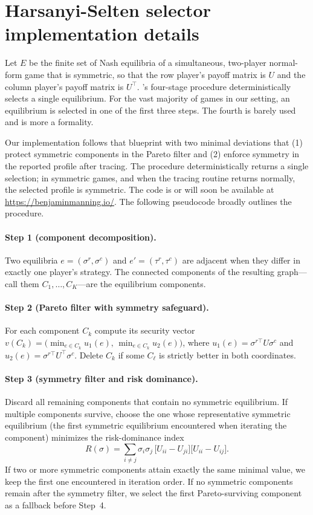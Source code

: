 \section{Harsanyi-Selten selector implementation details}
\label{app:nash-selector}

Let $E$ be the finite set of Nash equilibria of a simultaneous, two-player normal-form game that is symmetric, so that the row player's payoff matrix is $U$ and the column player's payoff matrix is $U^\top$.
\cite{HarsanyiSelten1988}'s four-stage procedure deterministically selects a single equilibrium.
For the vast majority of games in our setting, an equilibrium is selected in one of the first three steps.
The fourth is barely used and is more a formality.

Our implementation follows that blueprint with two minimal deviations that (1) protect symmetric components in the Pareto filter and (2) enforce symmetry in the reported profile after tracing.
The procedure deterministically returns a single selection; in symmetric games, and when the tracing routine returns normally, the selected profile is symmetric.
The code is or will soon be available at \url{https://benjaminmanning.io/}.
The following pseudocode broadly outlines the procedure.

\paragraph{Step 1 (component decomposition).}
Two equilibria $e=(\sigma^r,\sigma^c)$ and $e'=(\tau^r,\tau^c)$ are adjacent when they differ in exactly one player's strategy.
The connected components of the resulting graph---call them $C_1,\dots,C_K$---are the equilibrium components.

\paragraph{Step 2 (Pareto filter with symmetry safeguard).}
For each component $C_k$ compute its security vector $v(C_k)=\bigl(\min_{e\in C_k}u_1(e),\,\min_{e\in C_k}u_2(e)\bigr)$, where $u_1(e)=\sigma^{r\top}U\sigma^c$ and $u_2(e)=\sigma^{r\top}U^\top\sigma^c$.
Delete $C_k$ if some $C_\ell$ is strictly better in both coordinates. 

\paragraph{Step 3 (symmetry filter and risk dominance).}
Discard all remaining components that contain no symmetric equilibrium.
If multiple components survive, choose the one whose representative symmetric equilibrium (the first symmetric equilibrium encountered when iterating the component) minimizes the risk-dominance index
\[
R(\sigma)=\sum_{i\neq j}\sigma_i\sigma_j\,
\bigl[U_{ii}-U_{ji}\bigr]\bigl[U_{ii}-U_{ij}\bigr].
\]
If two or more symmetric components attain exactly the same minimal value, we keep the first one encountered in iteration order.
If no symmetric components remain after the symmetry filter, we select the first Pareto-surviving component as a fallback before Step~4.

